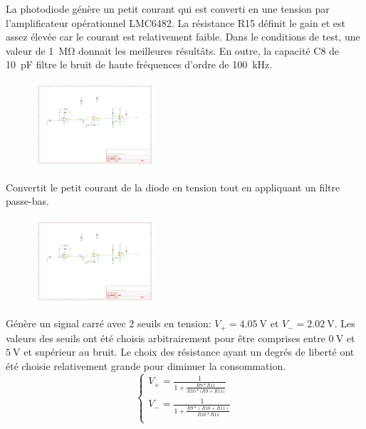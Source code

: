 \documentclass[french]{layout/Report}
\begin{document}
\begin{description}[leftmargin=!,labelwidth=3cm, labelindent=\parindent]
	\item[Convertisseur]
		La photodiode génère un petit courant qui est converti en une tension par l'amplificateur opérationnel LMC6482\cite{LMC6482}.
		La résistance R15 définit le gain et est assez élevée car le courant est relativement faible.
		Dans le conditions de test, une valeur de \SI{1}{\mega\ohm} donnait les meilleures résultâts.
		En outre, la capacité C8 de \SI{10}{\pico\farad} filtre le bruit de haute fréquences d'ordre de \SI{100}{\kilo Hz}.

		\begin{figure}[H]
			\centering
			\includegraphics[width=0.4\textwidth]{fig/current_to_voltage_converter.pdf}
		\end{figure}

	\item[Amplificateur] Convertit le petit courant de la diode en tension tout en appliquant un filtre passe-bas.

		\begin{figure}[H]
			\centering
			\includegraphics[width=0.4\textwidth]{fig/amplifier.pdf}
		\end{figure}

\item[Schmitt trigger] Génère un signal carré avec 2 seuils en tension: $V_+ = \SI{4.05}{\volt}$ et $V_- = \SI{2.02}{\volt}$. Les valeurs des seuils ont été choisis arbitrairement pour être comprises entre $\SI{0}{\volt}$ et $\SI{5}{\volt}$ et supérieur au bruit. Le choix des résistance ayant un degrés de liberté ont été choisie relativement grande pour diminuer la consommation.
	\begin{equation*}
		\begin{cases}
			V_+ = \frac{1}{1+\frac{\mathit{R9}*\mathit{R11}}{\mathit{R10}*(\mathit{R9+\mathit{R11})}}} \\
			V_- = \frac{1}{1+\frac{\mathit{R9}*(\mathit{R10}+\mathit{R11})}{\mathit{R10}*\mathit{R11}}} \\
		\end{cases}
	\end{equation*}


\end{description}
\end{document}
